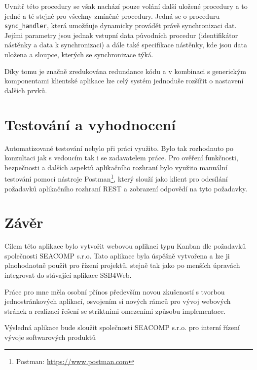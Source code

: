 Uvnitř této procedury se však nachází pouze volání další uložené procedury a to jedné a té stejné pro všechny zmíněné procedury. Jedná se o proceduru \texttt{sync\_handler}, která umožňuje dynamicky provádět právě synchronizaci dat. Jejími parametry jsou jednak vstupní data původních procedur (identifikátor nástěnky a data k synchronizaci) a dále také specifikace nástěnky, kde jsou data uložena a sloupce, kterých se synchronizace týká.

Díky tomu je značně zredukována redundance kódu a v kombinaci s generickým komponentami klientské aplikace lze celý systém jednoduše rozšířit o nastavení dalších prvků.





\chapter{Testování a vyhodnocení}
\blindtext

Automatizované testování nebylo při práci využito. Bylo tak rozhodnuto po konzultaci jak s vedoucím tak i se zadavatelem práce. Pro ověření funkčnosti, bezpečnosti a dalších aspektů aplikačního rozhraní bylo využito manuální testování pomocí nástroje Postman\footnote{Postman: \url{https://www.postman.com}}, který slouží jako klient pro odesílání požadavků aplikačního rozhraní REST a zobrazení odpovědí na tyto požadavky.

\blindtext[3]



\chapter{Závěr}
Cílem této aplikace bylo vytvořit webovou aplikaci typu Kanban dle požadavků společnosti SEACOMP s.r.o. Tato aplikace byla úspěšně vytvořena a lze ji plnohodnotně použít pro řízení projektů, stejně tak jako po menších úpravách integrovat do stávající aplikace SSB4Web.

\blindtext

Práce pro mne měla osobní přínos především novou zkušeností s tvorbou jednostránkových aplikací, osvojením si nových rámců pro vývoj webových stránek a realizací řešení se striktními omezeními způsobu implementace.

Výsledná aplikace bude sloužit společnosti SEACOMP s.r.o. pro interní řízení vývoje softwarových produktů 

